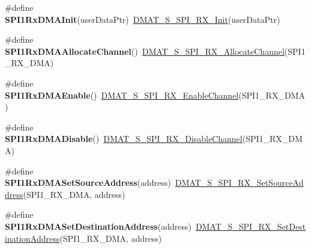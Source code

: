\begin{DoxyCompactItemize}
\item 
\hypertarget{group___func_ala_gac282fa9c6772137e5d0009a3d913b95e}{\#define {\bfseries S\-P\-I1\-Rx\-D\-M\-A\-Init}(user\-Data\-Ptr)~\hyperlink{group___d_m_a_t___s___s_p_i___r_x__module_ga37c9769ae1f8aef614b95ba793ef2025}{D\-M\-A\-T\-\_\-\-S\-\_\-\-S\-P\-I\-\_\-\-R\-X\-\_\-\-Init}(user\-Data\-Ptr)}\label{group___func_ala_gac282fa9c6772137e5d0009a3d913b95e}

\item 
\hypertarget{group___func_ala_ga50fa89713e2ce97ce2122844eba0b7f8}{\#define {\bfseries S\-P\-I1\-Rx\-D\-M\-A\-Allocate\-Channel}()~\hyperlink{group___d_m_a_t___s___s_p_i___r_x__module_gaa1162bc374403ec8d6774a0aaf124e8b}{D\-M\-A\-T\-\_\-\-S\-\_\-\-S\-P\-I\-\_\-\-R\-X\-\_\-\-Allocate\-Channel}(S\-P\-I1\-\_\-\-R\-X\-\_\-\-D\-M\-A)}\label{group___func_ala_ga50fa89713e2ce97ce2122844eba0b7f8}

\item 
\hypertarget{group___func_ala_gad6206660300529917d68c847e1747ab8}{\#define {\bfseries S\-P\-I1\-Rx\-D\-M\-A\-Enable}()~\hyperlink{group___d_m_a_t___s___s_p_i___r_x__module_ga09c8b0a8458086aff28098984a90fa08}{D\-M\-A\-T\-\_\-\-S\-\_\-\-S\-P\-I\-\_\-\-R\-X\-\_\-\-Enable\-Channel}(S\-P\-I1\-\_\-\-R\-X\-\_\-\-D\-M\-A)}\label{group___func_ala_gad6206660300529917d68c847e1747ab8}

\item 
\hypertarget{group___func_ala_ga76125c940b21dc99dcb0e9d2ba57f3a8}{\#define {\bfseries S\-P\-I1\-Rx\-D\-M\-A\-Disable}()~\hyperlink{group___d_m_a_t___s___s_p_i___r_x__module_ga693d74a3e5ae5f976ee0c1026c67cfe9}{D\-M\-A\-T\-\_\-\-S\-\_\-\-S\-P\-I\-\_\-\-R\-X\-\_\-\-Disable\-Channel}(S\-P\-I1\-\_\-\-R\-X\-\_\-\-D\-M\-A)}\label{group___func_ala_ga76125c940b21dc99dcb0e9d2ba57f3a8}

\item 
\hypertarget{group___func_ala_ga24cdfe93a66bc18865996c8df1eaffc1}{\#define {\bfseries S\-P\-I1\-Rx\-D\-M\-A\-Set\-Source\-Address}(address)~\hyperlink{group___d_m_a_t___s___s_p_i___r_x__module_ga7b59a41d88892ec3cb5a344e39fa4f61}{D\-M\-A\-T\-\_\-\-S\-\_\-\-S\-P\-I\-\_\-\-R\-X\-\_\-\-Set\-Source\-Address}(S\-P\-I1\-\_\-\-R\-X\-\_\-\-D\-M\-A, address)}\label{group___func_ala_ga24cdfe93a66bc18865996c8df1eaffc1}

\item 
\hypertarget{group___func_ala_ga46bcc9988403e4c1f94932800253bf9f}{\#define {\bfseries S\-P\-I1\-Rx\-D\-M\-A\-Set\-Destination\-Address}(address)~\hyperlink{group___d_m_a_t___s___s_p_i___r_x__module_gab7d59bf4b8848b9a5377cbbad357cecc}{D\-M\-A\-T\-\_\-\-S\-\_\-\-S\-P\-I\-\_\-\-R\-X\-\_\-\-Set\-Destination\-Address}(S\-P\-I1\-\_\-\-R\-X\-\_\-\-D\-M\-A, address)}\label{group___func_ala_ga46bcc9988403e4c1f94932800253bf9f}


\end{DoxyCompactItemize}
